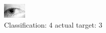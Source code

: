\begin{figure}[h!]
\begin{center}
\includegraphics[width=0.60\columnwidth]{figures/ID1368_class_4_target_3.png}
\end{center}
\caption{ Classification: 4 actual target: 3}
\label{fig:ID1368_class_4_target_3}
\end{figure}
